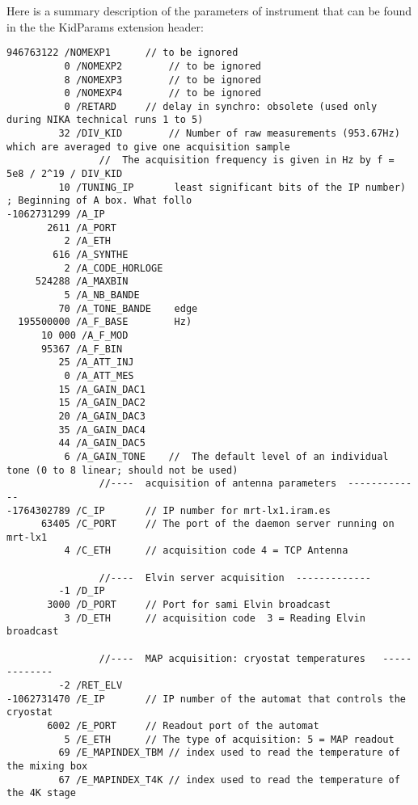 \documentclass[a4paper,10pt]{article}
\begin{document}
Here is a summary description of the parameters of instrument that can be
found in the the KidParams extension header:
\begin{verbatim}
946763122 /NOMEXP1		// to be ignored                                                                          
          0 /NOMEXP2		// to be ignored                                                                          
          8 /NOMEXP3		// to be ignored                                                                          
          0 /NOMEXP4		// to be ignored                                                                          
          0 /RETARD		// delay in synchro: obsolete (used only during NIKA technical runs 1 to 5)               
         32 /DIV_KID		// Number of raw measurements (953.67Hz) which are averaged to give one acquisition sample
				//  The acquisition frequency is given in Hz by f = 5e8 / 2^19 / DIV_KID
         10 /TUNING_IP		 least significant bits of the IP number)
; Beginning of A box. What follo
-1062731299 /A_IP		
       2611 /A_PORT		
          2 /A_ETH		
        616 /A_SYNTHE		
          2 /A_CODE_HORLOGE	
     524288 /A_MAXBIN		 
          5 /A_NB_BANDE		
         70 /A_TONE_BANDE	 edge
  195500000 /A_F_BASE		 Hz)
      10 000 /A_F_MOD		
      95367 /A_F_BIN		
         25 /A_ATT_INJ		
          0 /A_ATT_MES		
         15 /A_GAIN_DAC1	
         15 /A_GAIN_DAC2
         20 /A_GAIN_DAC3
         35 /A_GAIN_DAC4
         44 /A_GAIN_DAC5
          6 /A_GAIN_TONE	//  The default level of an individual tone (0 to 8 linear; should not be used)
				//----  acquisition of antenna parameters  -------------
-1764302789 /C_IP		// IP number for mrt-lx1.iram.es
      63405 /C_PORT		// The port of the daemon server running on mrt-lx1
          4 /C_ETH		// acquisition code 4 = TCP Antenna 
		
				//----  Elvin server acquisition  -------------
         -1 /D_IP
       3000 /D_PORT		// Port for sami Elvin broadcast
          3 /D_ETH		// acquisition code  3 = Reading Elvin broadcast

				//----  MAP acquisition: cryostat temperatures   -------------
         -2 /RET_ELV
-1062731470 /E_IP		// IP number of the automat that controls the cryostat
       6002 /E_PORT		// Readout port of the automat
          5 /E_ETH		// The type of acquisition: 5 = MAP readout
         69 /E_MAPINDEX_TBM	// index used to read the temperature of the mixing box
         67 /E_MAPINDEX_T4K	// index used to read the temperature of the 4K stage



\end{verbatim}
\end{document}
